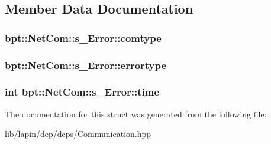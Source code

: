 \subsection{Member Data Documentation}
\hypertarget{structbpt_1_1_net_com_1_1s___error_ad6b991cce7ff009d5e8bf95804f7b222}{
\subsubsection[{comtype}]{ bpt\-::\-Net\-Com\-::s\-\_\-\-Error\-::comtype}}\label{structbpt_1_1_net_com_1_1s___error_ad6b991cce7ff009d5e8bf95804f7b222}
\hypertarget{structbpt_1_1_net_com_1_1s___error_a9ae8c2f208e5293733004f5fc86c3cb9}{
\subsubsection[{errortype}]{ bpt\-::\-Net\-Com\-::s\-\_\-\-Error\-::errortype}}\label{structbpt_1_1_net_com_1_1s___error_a9ae8c2f208e5293733004f5fc86c3cb9}
\hypertarget{structbpt_1_1_net_com_1_1s___error_a6438a0f6455c0034c96d6237bd0e2293}{
\subsubsection[{time}]{ {\bf int} bpt\-::\-Net\-Com\-::s\-\_\-\-Error\-::time}}\label{structbpt_1_1_net_com_1_1s___error_a6438a0f6455c0034c96d6237bd0e2293}


The documentation for this struct was generated from the following file\-:\begin{DoxyCompactItemize}
\item 
lib/lapin/dep/deps/\hyperlink{_communication_8hpp}{Communication.\-hpp}\end{DoxyCompactItemize}
